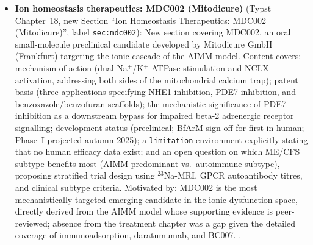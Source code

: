 \begin{itemize}
  \item \textbf{Ion homeostasis therapeutics: MDC002 (Mitodicure)}
    (Typst Chapter~18, new Section ``Ion Homeostasis Therapeutics: MDC002 (Mitodicure)'',
    label \texttt{sec:mdc002}):
    New section covering MDC002, an oral small-molecule preclinical candidate
    developed by Mitodicure GmbH (Frankfurt) targeting the ionic cascade of
    the AIMM model. Content covers: mechanism of action (dual Na$^+$/K$^+$-ATPase
    stimulation and NCLX activation, addressing both sides of the mitochondrial
    calcium trap); patent basis (three applications specifying NHE1 inhibition,
    PDE7 inhibition, and benzoxazole/benzofuran scaffolds); the mechanistic
    significance of PDE7 inhibition as a downstream bypass for impaired
    beta-2 adrenergic receptor signalling; development status (preclinical;
    BfArM sign-off for first-in-human; Phase~I projected autumn 2025);
    a \texttt{limitation} environment explicitly stating that no human efficacy
    data exist; and an open question on which ME/CFS subtype benefits most
    (AIMM-predominant vs.\ autoimmune subtype), proposing stratified trial
    design using $^{23}$Na-MRI, GPCR autoantibody titres, and clinical subtype criteria.
    Motivated by: MDC002 is the most mechanistically targeted emerging candidate
    in the ionic dysfunction space, directly derived from the AIMM model whose
    supporting evidence is peer-reviewed; absence from the treatment chapter
    was a gap given the detailed coverage of immunoadsorption, daratumumab, and BC007.
    \cite{Scheibenbogen2025muscle,WirthScheibenbogen2021muscle,Petter2022sodium,WirthScheibenbogen2020}.


\end{itemize}
